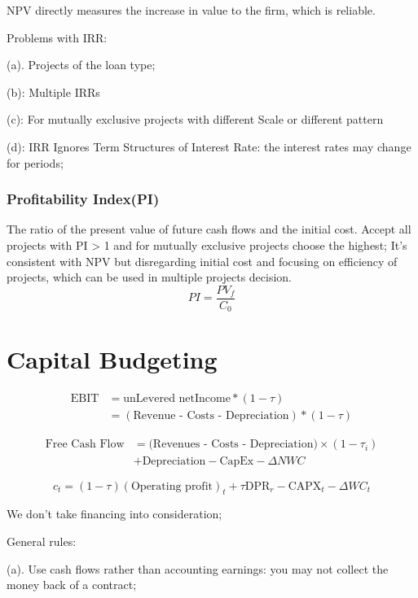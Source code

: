 \documentclass[10pt, a4paper]{article}
\begin{document}
                NPV directly measures the increase in value to the firm, which is reliable. 

                Problems with IRR: 

                \quad(a). Projects of the loan type; 

                \quad(b): Multiple IRRs
                
                \quad(c):  For mutually exclusive projects with different Scale or different pattern

                \quad(d): IRR Ignores Term Structures of Interest Rate: the interest rates may change for periods;
            \subsubsection{Profitability Index(PI)}
                The ratio of the present value of future cash flows and the initial cost. Accept all projects with PI > 1 and for mutually exclusive projects choose the highest; It's consistent with NPV but disregarding initial cost and focusing on efficiency of projects, which can be used in multiple projects decision. 
                $$PI = \frac{PV_f}{C_0}$$
\newpage
    \section{Capital Budgeting}
    $$\begin{aligned}
        \text{EBIT} &= \text{unLevered netIncome} * (1 - \tau) \\
            &= (\text{Revenue - Costs - Depreciation}) * (1 - \tau)
    \end{aligned}$$

    $$\begin{aligned}
                \text{Free Cash Flow} &=
            \text{(Revenues - Costs - Depreciation)} \times (1 - \tau_i) \\
            &+ \text{Depreciation} - \text{CapEx} - \Delta NWC
            \end{aligned}$$
    
    $$c_t = (1 - \tau)(\text{Operating profit})_t + \tau \text{DPR}_r - \text{CAPX}_t - \Delta WC_t$$

    We don't take financing into consideration;

    General rules: 

    \quad(a). Use cash flows rather than accounting earnings: you may not collect the money back of a contract; 
    
\end{document}
